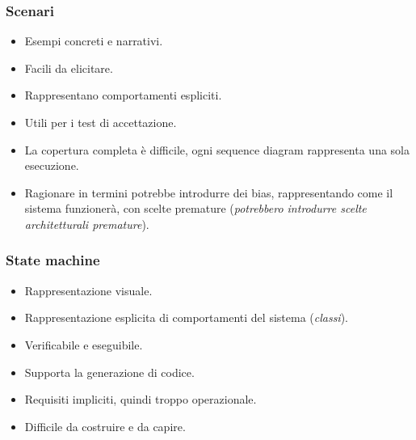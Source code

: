 \subsubsection{Scenari}
\begin{tcolorbox}[colback=green!5!white,colframe=green!75!black, title=Vantaggi degli scenari]
    \begin{itemize}
        \item Esempi concreti e narrativi.
        \item Facili da elicitare.
        \item Rappresentano comportamenti espliciti.
        \item Utili per i test di accettazione.
    \end{itemize}
\end{tcolorbox}
\begin{tcolorbox}[colback=red!5!white,colframe=red!75!black, title=Limiti degli scenari]
    \begin{itemize}
        \item La copertura completa è difficile, ogni sequence diagram rappresenta
        una sola esecuzione.
        \item Ragionare in termini potrebbe introdurre dei bias, rappresentando 
        come il sistema funzionerà, con scelte premature (\textit{potrebbero introdurre 
        scelte architetturali premature}).
    \end{itemize}
\end{tcolorbox}
\subsubsection{State machine}
\begin{tcolorbox}[colback=green!5!white,colframe=green!75!black, title=Vantaggi delle state machine]
    \begin{itemize}
        \item Rappresentazione visuale.
        \item Rappresentazione esplicita di comportamenti del sistema (\textit{classi}).
        \item Verificabile e eseguibile.
        \item Supporta la generazione di codice.
    \end{itemize}
\end{tcolorbox}
\begin{tcolorbox}[colback=red!5!white,colframe=red!75!black, title=Limiti delle state machine]
    \begin{itemize}
        \item Requisiti impliciti, quindi troppo operazionale.
        \item Difficile da costruire e da capire.
    \end{itemize}
\end{tcolorbox}

